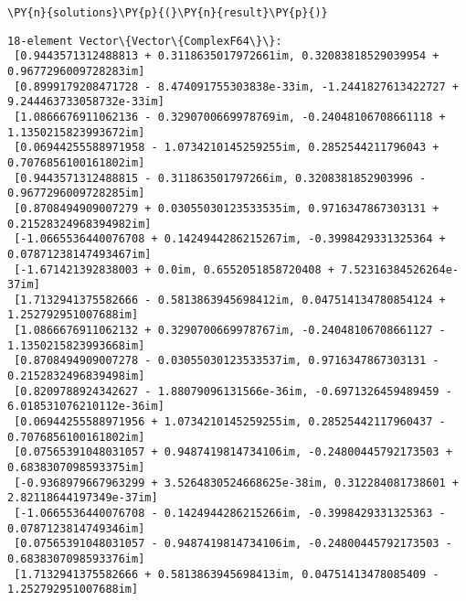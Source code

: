    \begin{tcolorbox}[breakable, size=fbox, boxrule=1pt, pad at break*=1mm,colback=cellbackground, colframe=cellborder]
\begin{Verbatim}[commandchars=\\\{\}]
\PY{n}{solutions}\PY{p}{(}\PY{n}{result}\PY{p}{)}
\end{Verbatim}
\end{tcolorbox}

    
    \begin{Verbatim}[commandchars=\\\{\}]
18-element Vector\{Vector\{ComplexF64\}\}:
 [0.9443571312488813 + 0.3118635017972661im, 0.32083818529039954 + 0.9677296009728283im]
 [0.8999179208471728 - 8.474091755303838e-33im, -1.2441827613422727 + 9.244463733058732e-33im]
 [1.0866676911062136 - 0.3290700669978769im, -0.24048106708661118 + 1.1350215823993672im]
 [0.06944255588971958 - 1.0734210145259255im, 0.2852544211796043 + 0.7076856100161802im]
 [0.9443571312488815 - 0.311863501797266im, 0.3208381852903996 - 0.9677296009728285im]
 [0.8708494909007279 + 0.03055030123533535im, 0.9716347867303131 + 0.21528324968394982im]
 [-1.0665536440076708 + 0.1424944286215267im, -0.3998429331325364 + 0.07871238147493467im]
 [-1.671421392838003 + 0.0im, 0.6552051858720408 + 7.52316384526264e-37im]
 [1.7132941375582666 - 0.5813863945698412im, 0.047514134780854124 + 1.252792951007688im]
 [1.0866676911062132 + 0.3290700669978767im, -0.24048106708661127 - 1.1350215823993668im]
 [0.8708494909007278 - 0.03055030123533537im, 0.9716347867303131 - 0.2152832496839498im]
 [0.8209788924342627 - 1.88079096131566e-36im, -0.6971326459489459 - 6.018531076210112e-36im]
 [0.06944255588971956 + 1.0734210145259255im, 0.28525442117960437 - 0.7076856100161802im]
 [0.07565391048031057 + 0.9487419814734106im, -0.24800445792173503 + 0.6838307098593375im]
 [-0.9368979667963299 + 3.5264830524668625e-38im, 0.312284081738601 + 2.82118644197349e-37im]
 [-1.0665536440076708 - 0.1424944286215266im, -0.3998429331325363 - 0.0787123814749346im]
 [0.07565391048031057 - 0.9487419814734106im, -0.24800445792173503 - 0.6838307098593376im]
 [1.7132941375582666 + 0.5813863945698413im, 0.04751413478085409 - 1.252792951007688im]
    \end{Verbatim}